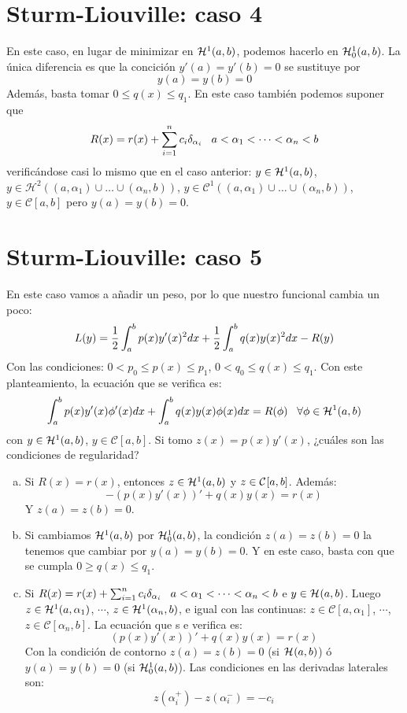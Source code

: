 \section{Sturm-Liouville: caso 4}

En este caso, en lugar de minimizar en $\sobolev{1}$, podemos hacerlo en $\sobolevcero{1}$. La única diferencia es que la concición $y'(a)=y'(b)=0$ se sustituye por
\[
y(a)=y(b)=0
\]
Además, basta tomar $0\leq q(x)\leq q_1$. En este caso también podemos suponer que 
\[
R(x)=r(x)+\sum_{i=1}^nc_i\delta_{\alpha_i} \espacio a<\alpha_1<\cdots<\alpha_n<b
\]
verificándose casi lo mismo que en el caso anterior: $y\in\sobolev{1}$, $y\in\mathcal{H}^2\left((a,\alpha_1)\cup\dots\cup(\alpha_n,b)\right)$, $y\in\mathcal{C}^1\left((a,\alpha_1)\cup\dots\cup(\alpha_n,b)\right)$, $y\in\mathcal{C}[a,b]$ pero $y(a)=y(b)=0$.

\section{Sturm-Liouville: caso 5}

En este caso vamos a añadir un peso, por lo que nuestro funcional cambia un poco:
\[
L(y)=\frac{1}{2}\integral{a}{b}{p(x)y'(x)^2dx}+\frac{1}{2}\integral{a}{b}{q(x)y(x)^2dx}-R(y)
\]
Con las condiciones: $0<p_0\leq p(x) \leq p_1$, $0<q_0\leq q(x) \leq q_1$.
Con este planteamiento, la ecuación que se verifica es:
\[
\integral{a}{b}{p(x)y'(x)\phi'(x)dx}+\integral{a}{b}{q(x)y(x)\phi(x)dx}=R(\phi) \espacio \forall \phi\in\sobolev{1}
\]
con $y\in\sobolev{1}$, $y\in\mathcal{C}[a,b]$. Si tomo $z(x)=p(x)y'(x)$, ¿cuáles son las condiciones de regularidad?
\begin{enumerate}[(a)]
\item Si $R(x)=r(x)$, entonces $z\in\sobolev{1}$ y $z\in\continuas$. Además:
\[
-(p(x)y'(x))'+q(x)y(x)=r(x)
\]
Y $z(a)=z(b)=0$.
\item Si cambiamos $\sobolev{1}$ por $\sobolevcero{1}$, la condición $z(a)=z(b)=0$ la tenemos que cambiar por $y(a)=y(b)=0$. Y en este caso, basta con que se cumpla $0\geq q(x)\leq q_1$.
\item Si $R(x)=r(x)+\sum_{i=1}^nc_i\delta_{\alpha_i} \espacio a<\alpha_1<\cdots<\alpha_n<b$ e $y\in\sobolev{}$. Luego $z\in\sobolev[a,\alpha_1]{1}$, $\cdots$, $z\in\sobolev[\alpha_n,b]{1}$, e igual con las continuas: $z\in\mathcal{C}[a,\alpha_1]$, $\cdots$, $z\in\mathcal{C}[\alpha_n,b]$. La ecuación que s e verifica es:
\[
(p(x)y'(x))'+q(x)y(x)=r(x)
\]
Con la condición de contorno $z(a)=z(b)=0$ (si $\sobolev{}$) ó $y(a)=y(b)=0$ (si $\sobolevcero{1}$). Las condiciones en las derivadas laterales son:
\[
z(\alpha^+_i)-z(\alpha_i^-)=-c_i
\]
\end{enumerate}

